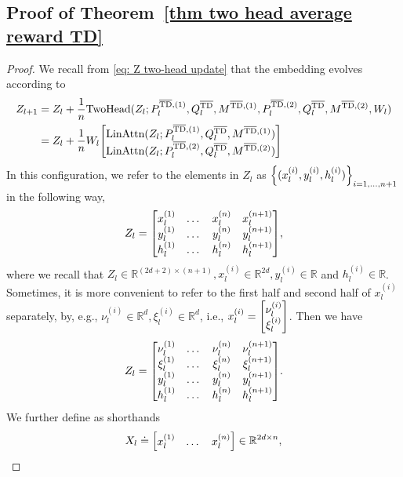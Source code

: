\documentclass{article}
\newcommand{\R}{\mathbb{R}}
\newcommand{\attn}{\text{LinAttn}}
\newcommand{\twohead}{\text{TwoHead}}
\newcommand{\bartd}{\overline{\text{TD}}}
\begin{document}
\subsection{Proof of Theorem~\ref{thm two head average reward TD}}
\label{sec proof thm two head average reward TD}
\begin{proof}
    We recall from \eqref{eq: Z two-head update} that the embedding evolves according to
    \begin{align}
        Z_{l+1}
        &= Z_l + \frac{1}{n} \twohead(Z_l; P_l^{\bartd, (1)}, Q_l^{\bartd}, M^{\bartd, (1)}, P_l^{\bartd, (2)}, Q_l^{\bartd}, M^{\bartd, (2)}, W_l)\\
        &= Z_l + \frac{1}{n} W_l \mqty[\attn(Z_l; P_l^{\bartd, (1)}, Q_l^{\bartd}, M^{\bartd, (1)}) \\
                                       \attn(Z_l; P_l^{\bartd, (2)}, Q_l^{\bartd}, M^{\bartd, (2)})]
    \end{align}
     In this configuration, we refer to the elements in $Z_l$ as $\qty{(x^{(i)}_l, y^{(i)}_l, h^{(i)}_l)}_{i=1,\dots, n+1}$ in the following way,
    \begin{align}
        Z_l = \mqty[x_l^{(1)} & \dots & x_l^{(n)} & x_l^{(n+1)} \\
                    y_l^{(1)} & \dots & y_l^{(n)} & y_l^{(n+1)} \\
                    h_l^{(1)} & \dots & h_l^{(n)} & h_l^{(n+1)}],
    \end{align}
    where we recall that $Z_l \in \R^{(2d + 2) \times (n+1)}, x_l^{(i)} \in \R^{2d}, y^{(i)}_l \in \R$ and $h^{(i)}_l \in \R$.
    Sometimes, it is more convenient to refer to the first half and second half of $x_l^{(i)}$ separately,
    by, e.g., $\nu^{(i)}_l \in \R^d, \xi_l^{(i)} \in \R^d$, i.e., $x_l^{(i)} = \mqty[\nu_l^{(i)} \\ \xi_l^{(i)}]$.
    Then we have
    \begin{align}
        Z_l = \mqty[\nu_l^{(1)} & \dots & \nu_l^{(n)} & \nu_l^{(n+1)} \\
        \xi_l^{(1)} & \dots & \xi_l^{(n)} & \xi_l^{(n+1)} \\
         y_l^{(1)} & \dots & y_l^{(n)} & y_l^{(n+1)} \\
         h_l^{(1)} & \dots & h_l^{(n)} & h_l^{(n+1)}].
    \end{align}
    We further define as shorthands
    \begin{align}
        X_l &\doteq \mqty[x_l^{(1)} & \dots & x_l^{(n)}] \in \R^{2d \times n}, \\

\end{align}
\end{proof}
\end{document}
